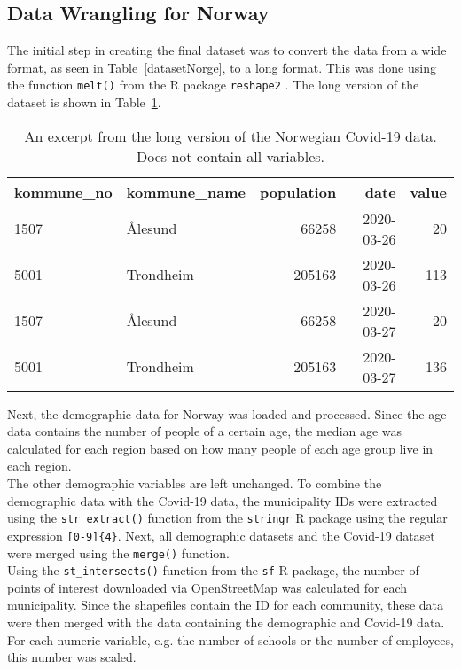 \subsection{Data Wrangling for Norway}
The initial step in creating the final dataset was to convert the data from a wide format, as seen in Table~\ref{datasetNorge}, to a long format. This was done using the function \texttt{melt()} from the R package \texttt{reshape2} \autocite[][]{reshape2}. The long version of the dataset is shown in Table~\ref{norwayLong}.
\begin{table}[H] 
\caption{An excerpt from the long version of the Norwegian Covid-19 data. Does not contain all variables.\label{norwayLong}}
\begin{tabular}{l l r r r}
\toprule
\textbf{kommune\_no}	& \textbf{kommune\_name}	& \textbf{population} & \textbf{date} & \textbf{value}\\
\midrule
1507 & Ålesund & 66258 & 2020-03-26 & 20\\
5001 & Trondheim  & 205163  & 2020-03-26 & 113\\
1507 & Ålesund & 66258 & 2020-03-27 & 20\\
5001 & Trondheim  & 205163  & 2020-03-27 & 136\\
\bottomrule
\end{tabular}
\end{table}
Next, the demographic data for Norway was loaded and processed. Since the age data contains the number of people of a certain age, the median age was calculated for each region based on how many people of each age group live in each region. \\
The other demographic variables are left unchanged. To combine the demographic data with the Covid-19 data, the municipality IDs were extracted using the \texttt{str\_extract()} function from the \texttt{stringr} \autocite[][]{stringr} R package using the regular expression \texttt{[0-9]\{4\}}. Next, all demographic datasets and the Covid-19 dataset were merged using the \texttt{merge()} function. \\
Using the \texttt{st\_intersects()} function from the \texttt{sf} \autocite[][]{sf} R package, the number of points of interest downloaded via OpenStreetMap was calculated for each municipality. Since the shapefiles contain the ID for each community, these data were then merged with the data containing the demographic and Covid-19 data. \\
For each numeric variable, e.g. the number of schools or the number of employees, this number was scaled. \\
